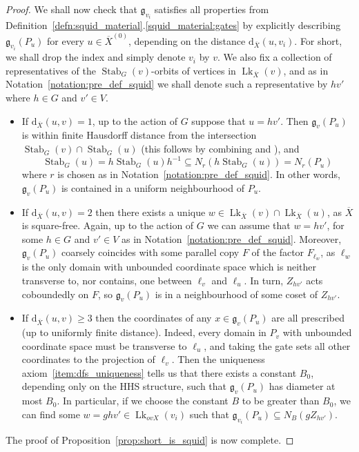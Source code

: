 \documentclass[svgnames]{amsart}
\theoremstyle{plain}
\theoremstyle{definition}
\newcommand{\ov}[1]{\overline{#1}}
\newcommand{\dist}{\mathrm{d}}
\newcommand{\link}{\operatorname{Lk}}
\newcommand{\Stab}[2]{\operatorname{Stab}_{#1}(#2)}
\newcommand{\gate}{\mathfrak{g}}
\begin{document}
\begin{proof}
We shall now check that $\gate_{v_i}$ satisfies all properties from Definition~\ref{defn:squid_material}.\eqref{squid_material:gates} by explicitly describing $\gate_{v_i}(P_u)$ for every $u\in\ov{X}^{(0)}$, depending on the distance $\dist_{\ov X}(u,{v_i})$. For short, we shall drop the index and simply denote $v_i$ by $v$. We also fix a collection of representatives of the $\Stab{G}{v}$-orbits of vertices in $\link_{\ov X}(v)$, and as in Notation~\ref{notation:pre_def_squid} we shall denote such a representative by $hv'$ where $h\in G$ and $v'\in V$. 


\begin{itemize}
    \item If $\dist_{\ov X}(u,{v})=1$, up to the action of $G$ suppose that $u=hv'$. Then $\gate_{v}(P_u)$ is within finite Hausdorff distance from the intersection $\Stab{G}{v}\cap \Stab{G}{u}$ (this follows by combining \cite[Lemma 4.10]{quasiflats} and \cite[Lemma 4.5]{Hruska_Wise}), and $$\Stab{G}{u}=h\Stab{G}{u}h^{-1}\subseteq N_r(h\Stab{G}{u})=N_r(P_u)$$ where $r$ is chosen as in Notation~\ref{notation:pre_def_squid}. In other words, $\gate_{v}(P_u)$ is contained in a uniform neighbourhood of $P_u$.
    
    \item If $\dist_{\ov X}(u,{v})=2$ then there exists a unique $w\in\link_{\ov X}({v})\cap\link_{\ov X}(u)$, as $\ov X$ is square-free. Again, up to the action of $G$ we can assume that $w=hv'$, for some $h\in G$ and $v'\in V$ as in Notation~\ref{notation:pre_def_squid}. Moreover, $\gate_v(P_u)$ coarsely coincides with some parallel copy $F$ of the factor $F_{\ell_w}$, as $\ell_w$ is the only domain with unbounded coordinate space which is neither transverse to, nor contains, one between $\ell_{v}$ and $\ell_u$. In turn, $Z_{hv'}$ acts coboundedly on $F$, so $\gate_v(P_u)$ is in a neighbourhood of some coset of $Z_{hv'}$. 
    \item If $\dist_{\ov X}(u,{v})\ge 3$ then the coordinates of any $x\in \gate_{v}(P_u)$ are all prescribed (up to uniformly finite distance). Indeed, every domain in $P_{v}$ with unbounded coordinate space must be transverse to $\ell_u$, and taking the gate sets all other coordinates to the projection of $\ell_{v}$. Then the uniqueness axiom~\eqref{item:dfs_uniqueness} tells us that there exists a constant $B_0$, depending only on the HHS structure, such that $\gate_{v}(P_u)$ has diameter at most $B_0$. In particular, if we choose the constant $B$ to be greater than $B_0$, we can find some $w=ghv'\in \link_{ov X}(v_i)$ such that $\gate_{v_i}(P_u)\subseteq N_B(gZ_{hv'})$.
\end{itemize}
The proof of Proposition~\ref{prop:short_is_squid} is now complete.
\end{proof}
\end{document}
